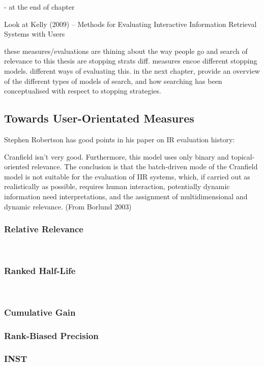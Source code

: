         - at the end of chapter

Look at Kelly (2009) -- Methods for Evaluating Interactive Information Retrieval Systems with Users

these measures/evaluations are thining about the way people go and search
of relevance to this thesis are stopping strats
diff. measures encoe different stopping models. different ways of evaluating this.
in the next chapter, provide an overview of the different types of models of search, and how searching has been conceptualised with respect to stopping strategies.

\subsection{Towards User-Orientated Measures}

Stephen Robertson has good points in his paper on IR evaluation history:~\cite{robertson2008history_ir_evaluation}

Cranfield isn't very good. Furthermore, this model uses only binary and topical-oriented relevance. The conclusion is that the batch-driven mode of the Cranfield model is not suitable for the evaluation of IIR systems, which, if carried out as realistically as possible, requires human interaction, potentially dynamic information need interpretations, and the assignment of multidimensional and dynamic relevance. (From Borlund 2003)

\subsubsection{Relative Relevance}
~\cite{borlund1997iir_evaluation}

\subsubsection{Ranked Half-Life}
~\cite{borlund1997iir_evaluation}

\subsubsection{Cumulative Gain}

\subsubsection{Rank-Biased Precision}

\subsubsection{INST}



